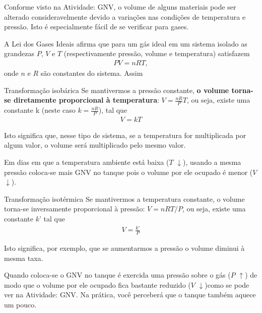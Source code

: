 \begin{reflection}

Conforme visto na Atividade: GNV, o volume de alguns materiais pode ser alterado consideravelmente devido a variações nas condições de temperatura e pressão. Isto é especialmente fácil de se verificar para gases.

A Lei dos Gases Ideais afirma que para um gás ideal em um sistema isolado as grandezas $P$, $V$ e $T$ (respectivamente pressão, volume e temperatura) satisfazem
\begin{equation*}
\begin{split}PV=nRT,\end{split}
\end{equation*}
onde $n$ e $R$ são constantes do sistema. Assim
\begin{observationtitle}{Transformação isobárica} 
Se mantivermos a pressão constante, \textbf{o volume torna-se diretamente proporcional à temperatura}: \(V=\frac{nR}{P}T\), ou seja, existe uma constante k (neste caso \(k=\frac{nR}{P}\)), tal que
\begin{equation*}
\begin{split}V=kT\end{split}
\end{equation*}
\end{observationtitle}
Isto significa que, nesse tipo de sistema, se a temperatura for multiplicada por algum valor, o volume será multiplicado pelo mesmo valor.

Em dias em que a temperatura ambiente está baixa ($T$ \(\downarrow\)), usando a mesma pressão coloca-se mais GNV no tanque pois o volume por ele ocupado é menor ($V$ \(\downarrow\)).
\begin{observationtitle}{Transformação isotérmica} 
Se mantivermos a temperatura constante, o volume torna-se inversamente proporcional à pressão: $V = nRT / P$, ou seja, existe uma constante $k’$ tal que
\begin{equation*}
\begin{split}V=\frac{k'}{P}\end{split}
\end{equation*}
\end{observationtitle}
Isto significa, por exemplo, que se aumentarmos a pressão o volume diminui à mesma taxa.

Quando coloca-se o GNV no tanque é exercida uma pressão sobre o gás ($P$ \(\uparrow\)) de modo que o volume por ele ocupado fica bastante reduzido ($V$ \(\downarrow\))como se pode ver na Atividade: GNV. Na prática, você perceberá que o tanque também aquece um pouco.


\end{reflection}
